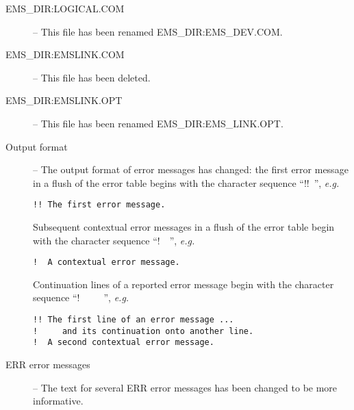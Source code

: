 \begin {description}
\item [EMS\_DIR:LOGICAL.COM] -- This file has been renamed 
EMS\_DIR:EMS\_DEV.COM.
\item [EMS\_DIR:EMSLINK.COM] -- This file has been deleted.
\item [EMS\_DIR:EMSLINK.OPT] -- This file has been renamed 
EMS\_DIR:EMS\_LINK.OPT.
\item [Output format] -- The output format of error messages has changed:
the first error message in a flush of the error table begins with the character
sequence ``!!~'', {\em e.g.}
\begin {small}
\begin{verbatim}
!! The first error message.
\end{verbatim}
\end {small}

Subsequent contextual error messages in a flush of the error table begin with
the character sequence ``!~~'', {\em e.g.}
\begin {small}
\begin{verbatim}
!  A contextual error message.
\end{verbatim}
\end {small}

Continuation lines of a reported error message begin with the character
sequence ``!~~~~~'', {\em e.g.}
\begin {small}
\begin{verbatim}
!! The first line of an error message ...
!     and its continuation onto another line.
!  A second contextual error message.
\end{verbatim}
\end {small}

\item [ERR error messages] -- The text for several ERR error messages has been
changed to be more informative.
\end {description}


